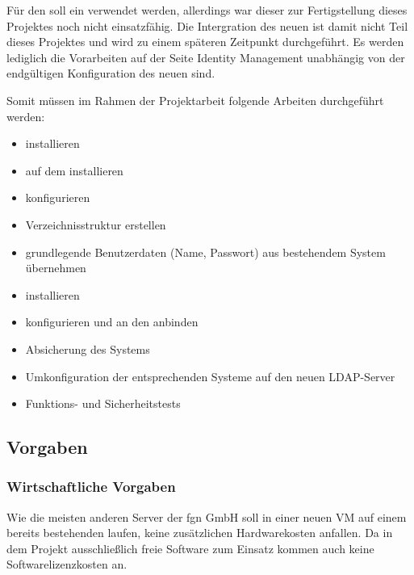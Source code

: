 \documentclass[11pt,a4paper,titlepage=firstiscover]{scrartcl} %
\begin{document}
Für den  soll ein  verwendet 
werden, allerdings war dieser zur Fertigstellung dieses Projektes noch nicht 
einsatzfähig. Die Intergration des neuen  ist damit nicht 
Teil dieses Projektes und wird zu einem späteren Zeitpunkt durchgeführt. Es 
werden lediglich die Vorarbeiten auf der Seite  Identity 
Management   unabhängig von der 
endgültigen Konfiguration des neuen  sind.

\medskip \noindent 		%
Somit müssen im Rahmen der Projektarbeit folgende Arbeiten durchgeführt werden: 
\begin{itemize}
	\item {} installieren
	\item {} auf dem  installieren
	\item {} konfigurieren
	\item Verzeichnisstruktur erstellen
	\item grundlegende Benutzerdaten (Name, Passwort) aus bestehendem System übernehmen
	\item {} installieren
	\item {} konfigurieren und an den  anbinden
	\item Absicherung des Systems
	\item Umkonfiguration der entsprechenden Systeme auf den neuen LDAP-Server
	\item Funktions- und Sicherheitstests
\end{itemize}


\subsection{Vorgaben}
\subsubsection{Wirtschaftliche Vorgaben}
Wie die meisten anderen Server der fgn GmbH soll  
in einer neuen VM auf einem bereits bestehenden  laufen, 
 keine zusätzlichen Hardwarekosten anfallen. Da in dem 
Projekt  ausschließlich freie Software zum Einsatz kommen 
 auch keine  
Softwarelizenzkosten an.
\end{document}
